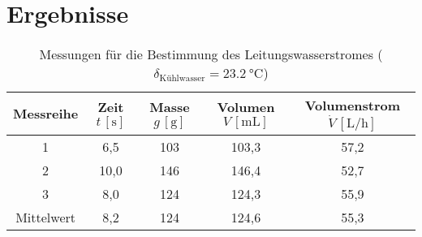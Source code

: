 \newpage
\section{Ergebnisse}
\label{sec:ergebnisse}

\begin{table}[h!]
	\renewcommand*{\arraystretch}{1.2}
	\centering
	\caption[Messungen für die Bestimmung des Leitungswasserstromes]{Messungen für die Bestimmung des Leitungswasserstromes ($\delta_{\text{Kühlwasser}}=\SI{23,2}{\celsius}$)}
	\label{tab:volumenstrom_kuehlung}
	\begin{tabulary}{1.1\textwidth}{C|C|C|C|C}
		\hline
		\textbf{Messreihe}& \textbf{Zeit $t \, \left[\si{\second}\right]$} & \textbf{Masse $g \, \left[\si{\gram}\right]$} & \textbf{Volumen $V \, \left[\si{\milli \liter}\right]$} & \textbf{Volumenstrom $\dot{V}\, \left[\si{\liter \per \hour}\right]$} \\
		 & 6,5				& 103 & 103,3 & 57,2\\
		2 & 10,0			& 146 & 146,4 & 52,7\\
		3 & 8,0				& 124 & 124,3 & 55,9\\
		\hline
		Mittelwert 	& 8,2	& 124 & 124,6 & 55,3\\ 		
		\hline	
	\end{tabulary}
\end{table}%
\FloatBarrier

